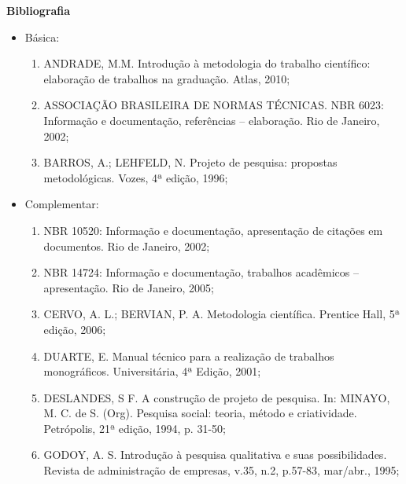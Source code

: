 
\begin{snugshade}\begin{center}\textbf{
    Bibliografia
}\end{center}\end{snugshade}

\begin{itemize} 

\item Básica:
    \begin{enumerate}

    \item ANDRADE, M.M. Introdução à metodologia do trabalho científico: elaboração de trabalhos na graduação. Atlas, 2010;
    
    \item ASSOCIAÇÃO BRASILEIRA DE NORMAS TÉCNICAS. NBR 6023: Informação e documentação, referências – elaboração. Rio de Janeiro, 2002;
    
    \item BARROS, A.; LEHFELD, N. Projeto de pesquisa: propostas metodológicas. Vozes, 4ª edição, 1996;
	
    \end{enumerate}

\item Complementar:
	\begin{enumerate} 

    \item NBR 10520: Informação e documentação, apresentação de citações em documentos. Rio de Janeiro, 2002;

    \item NBR 14724: Informação e documentação, trabalhos acadêmicos – apresentação. Rio de Janeiro, 2005;

    \item CERVO, A. L.; BERVIAN, P. A. Metodologia científica.  Prentice Hall, 5ª edição, 2006;

    \item DUARTE, E. Manual técnico para a realização de trabalhos monográficos.  Universitária, 4ª Edição, 2001;

    \item DESLANDES, S F. A construção de projeto de pesquisa. In: MINAYO, M. C. de S. (Org). Pesquisa social: teoria, método e criatividade.  Petrópolis, 21ª edição, 1994, p. 31-50;
 
    \item GODOY, A. S. Introdução à pesquisa qualitativa e suas possibilidades. Revista de administração de empresas, v.35, n.2, p.57-83, mar/abr., 1995;


\end{enumerate}
\end{itemize}

